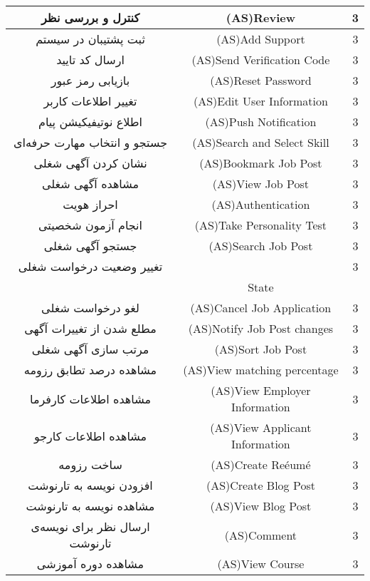 \documentclass[12pt]{article}
\begin{document}
\begin{longtable}{|c|c|c|}
		\hline
		کنترل و بررسی نظر & (AS)Review 
		 & 3     \\
		\hline
		ثبت پشتیبان در سیستم & (AS)Add Support & 3     \\
		\hline
		ارسال کد تایید & (AS)Send Verification Code & 3     \\
		\hline
		بازیابی رمز عبور‌‌ & (AS)Reset Password & 3     \\
		\hline
		تغییر اطلاعات کاربر & (AS)Edit User Information & 3     \\
		\hline
		اطلاع نوتیفیکیشن پیام & (AS)Push Notification & 3     \\
		\hline
		جستجو و انتخاب مهارت حرفه‌ای & (AS)Search and Select Skill & 3     \\
		\hline
		نشان کردن آگهی شغلی & (AS)Bookmark Job Post & 3     \\
		\hline
		مشاهده آگهی شغلی & (AS)View Job Post & 3     \\
		\hline
		احراز هویت & (AS)Authentication & 3     \\
		\hline
		انجام آزمون شخصیتی & (AS)Take Personality Test & 3     \\
		\hline
		جستجو آگهی شغلی & (AS)Search Job Post & 3     \\
		\hline
		تغییر وضعیت درخواست شغلی & 
		\lr{(AS)Change Job Application}
		 & 3     \\
		 &State&\\
		\hline
		لغو درخواست شغلی & (AS)Cancel Job Application & 3     \\
		\hline
		مطلع شدن از تغییرات آگهی‌ & (AS)Notify Job Post changes & 3     \\
		\hline
		مرتب سازی آگهی شغلی & (AS)Sort Job Post & 3     \\
		\hline
		مشاهده درصد تطابق رزومه & (AS)View matching percentage & 3     \\
		\hline
		مشاهده اطلاعات کارفرما & (AS)View Employer Information & 3     \\
		\hline
		مشاهده اطلاعات کارجو & (AS)View Applicant Information & 3     \\
		\hline
		ساخت رزومه & (AS)Create Reéumé & 3     \\
		\hline
		افزودن نویسه به تارنوشت & (AS)Create Blog Post & 3     \\
		\hline
		مشاهده نویسه به تارنوشت & (AS)View Blog Post & 3     \\
		\hline
		ارسال نظر برای نویسه‌ی تارنوشت & (AS)Comment & 3     \\
		\hline
		مشاهده دوره آموزشی & (AS)View Course & 3     \\

\end{longtable}
\end{document}
